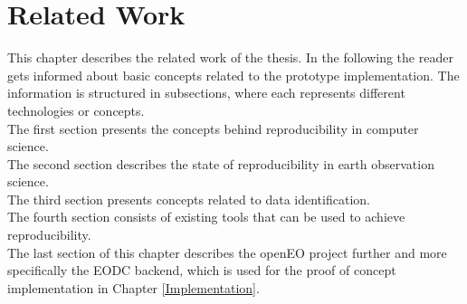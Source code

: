 \documentclass[draft,final]{vutinfth} %
\begin{document}
\chapter{Related Work}\label{Related Work}

This chapter describes the related work of the thesis. In the following the reader gets informed about basic concepts related to the prototype implementation. The information is structured in subsections, where each represents different technologies or concepts. \\The first section presents the concepts behind reproducibility in computer science. \\
The second section describes the state of reproducibility in earth observation science. \\
The third section presents concepts related to data identification. \\ 
The fourth section consists of existing tools that can be used to achieve reproducibility. \\
The last section of this chapter describes the openEO project further and more specifically the EODC backend, which is used for the proof of concept implementation in Chapter \ref{Implementation}.    
\end{document}
